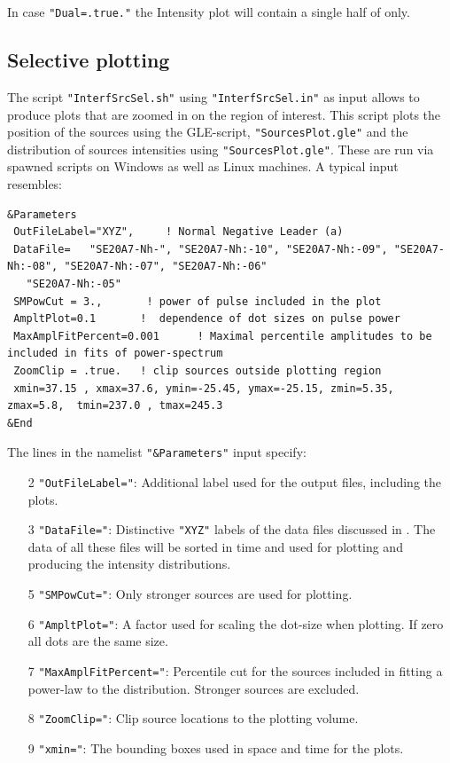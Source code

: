 In case \verb!"Dual=.true."! the Intensity plot will contain a single half of  only.

\subsection{Selective plotting}

The script \verb!"InterfSrcSel.sh"! using \verb!"InterfSrcSel.in"! as input allows to produce plots that are zoomed in on the region of interest. This script plots the position of the sources using the GLE-script, \verb!"SourcesPlot.gle"! and the distribution of sources intensities using \verb!"SourcesPlot.gle"!. These are run via spawned scripts on Windows as well as Linux machines.
A typical input resembles:

\begin{linenumbers}
\resetlinenumber
\begin{verbatim}
&Parameters
 OutFileLabel="XYZ",     ! Normal Negative Leader (a)
 DataFile=   "SE20A7-Nh-", "SE20A7-Nh:-10", "SE20A7-Nh:-09", "SE20A7-Nh:-08", "SE20A7-Nh:-07", "SE20A7-Nh:-06"
   "SE20A7-Nh:-05"
 SMPowCut = 3.,       ! power of pulse included in the plot
 AmpltPlot=0.1       !  dependence of dot sizes on pulse power
 MaxAmplFitPercent=0.001      ! Maximal percentile amplitudes to be included in fits of power-spectrum
 ZoomClip = .true.   ! clip sources outside plotting region
 xmin=37.15 , xmax=37.6, ymin=-25.45, ymax=-25.15, zmin=5.35, zmax=5.8,  tmin=237.0 , tmax=245.3
&End
\end{verbatim}
\end{linenumbers}

The lines in the namelist \verb!"&Parameters"! input specify:
\begin{enumerate}
\item[2] \verb!"OutFileLabel="!: Additional label used for the output files, including the plots.
\item[3] \verb!"DataFile="!: Distinctive \verb!"XYZ"! labels of the data files discussed in . The data of all these files will be sorted in time and used for plotting and producing the intensity distributions.
\item[5] \verb!"SMPowCut="!: Only stronger sources are used for plotting.
\item[6] \verb!"AmpltPlot="!: A factor used for scaling the dot-size when plotting. If zero all dots are the same size.
\item[7] \verb!"MaxAmplFitPercent="!: Percentile cut for the sources included in fitting a power-law to the distribution. Stronger sources are excluded.
\item[8] \verb!"ZoomClip="!: Clip source locations to the plotting volume.
\item[9] \verb!"xmin="!: The bounding boxes used in space and time for the plots.
\end{enumerate}

